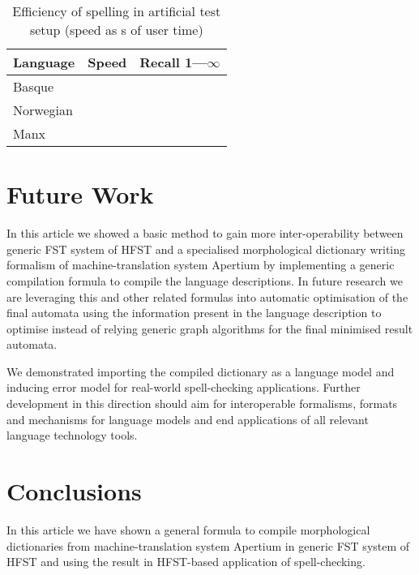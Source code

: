 \documentclass[10pt,a4paper]{article}
\begin{document}
\begin{table}[h]
\begin{center}
\begin{tabular}{|l|r|r|}
\hline
\bf Language & \bf Speed & \bf Recall 1---$\infty$ \\
\hline
Basque       & & \\
Norwegian    & & \\
Manx         & & \\
\hline
\end{tabular}
\caption{Efficiency of spelling in artificial test setup (speed as s of user
time)
\label{table:spelling}}
\end{center}
\end{table}

\section{Future Work}
\label{sec:future}

In this article we showed a basic method to gain more inter-operability between
generic FST system of HFST and a specialised morphological dictionary writing
formalism of machine-translation system Apertium by implementing a generic
compilation formula to compile the language descriptions. In future research
we are leveraging this and other related formulas into automatic optimisation
of the final automata using the information present in the language description
to optimise instead of relying generic graph algorithms for the final minimised
result automata.
 
We demonstrated importing the compiled dictionary as a language model and
inducing error model for real-world spell-checking applications. Further
development in this direction should aim for interoperable formalisms, formats
and mechanisms for language models and end applications of all relevant
language technology tools.

\section{Conclusions}
\label{sec:conclusions}

In this article we have shown a general formula to compile morphological
dictionaries from machine-translation system Apertium in generic FST system of
HFST and using the result in HFST-based application of spell-checking.





\end{document}

